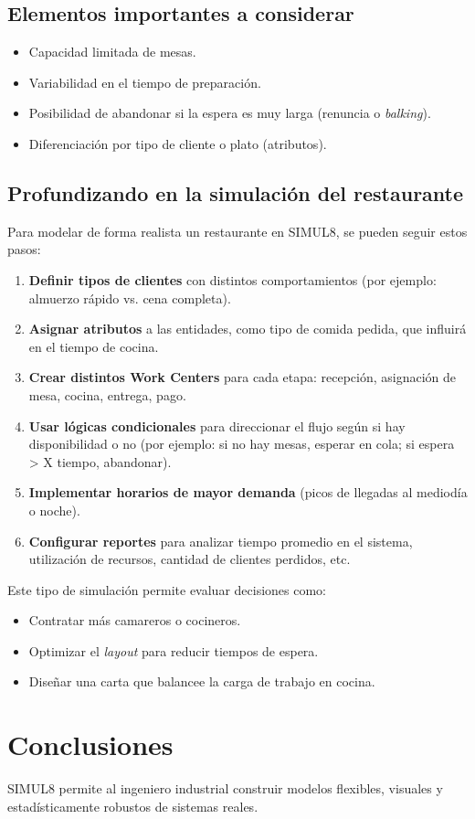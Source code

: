 \documentclass[12pt]{article}
\begin{document}
\subsection*{Elementos importantes a considerar}

\begin{itemize}
    \item Capacidad limitada de mesas.
    \item Variabilidad en el tiempo de preparación.
    \item Posibilidad de abandonar si la espera es muy larga (renuncia o \textit{balking}).
    \item Diferenciación por tipo de cliente o plato (atributos).
\end{itemize}

\subsection*{Profundizando en la simulación del restaurante}

Para modelar de forma realista un restaurante en SIMUL8, se pueden seguir estos pasos:

\begin{enumerate}
    \item \textbf{Definir tipos de clientes} con distintos comportamientos (por ejemplo: almuerzo rápido vs. cena completa).
    \item \textbf{Asignar atributos} a las entidades, como tipo de comida pedida, que influirá en el tiempo de cocina.
    \item \textbf{Crear distintos Work Centers} para cada etapa: recepción, asignación de mesa, cocina, entrega, pago.
    \item \textbf{Usar lógicas condicionales} para direccionar el flujo según si hay disponibilidad o no (por ejemplo: si no hay mesas, esperar en cola; si espera > X tiempo, abandonar).
    \item \textbf{Implementar horarios de mayor demanda} (picos de llegadas al mediodía o noche).
    \item \textbf{Configurar reportes} para analizar tiempo promedio en el sistema, utilización de recursos, cantidad de clientes perdidos, etc.
\end{enumerate}

Este tipo de simulación permite evaluar decisiones como:

\begin{itemize}
    \item Contratar más camareros o cocineros.
    \item Optimizar el \textit{layout} para reducir tiempos de espera.
    \item Diseñar una carta que balancee la carga de trabajo en cocina.
\end{itemize}

\section{Conclusiones}

SIMUL8 permite al ingeniero industrial construir modelos flexibles, visuales y estadísticamente robustos de sistemas reales. 
\end{document}

